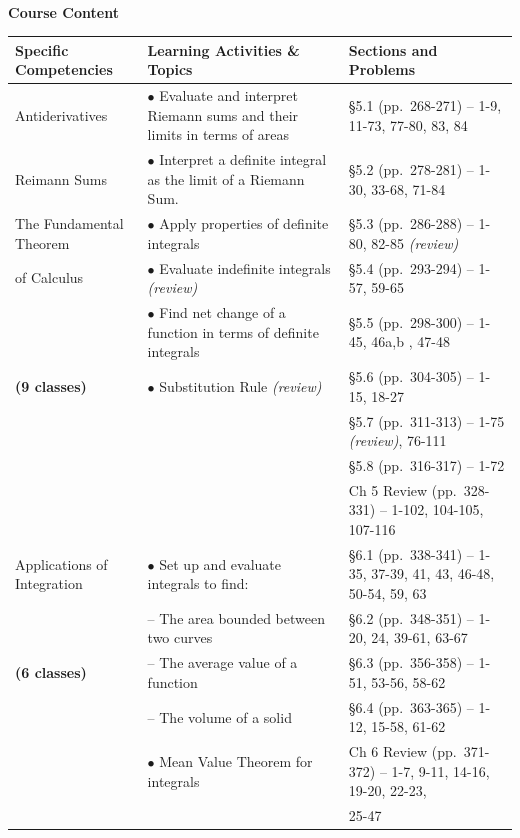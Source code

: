 \documentclass[10pt]{article}
\begin{document}
\vspace*{\fill}
\newpage
\begin{landscape}
$\,$\vspace{-0.75in}\\
\large{\textbf{Course Content}}\normalsize \\

\begin{longtable}[t]{||p{1.75in}|p{4.5in}|p{3.75in}||}
\hline
\textbf{Specific Competencies} & \textbf{Learning Activities \& Topics} & \textbf{Sections and Problems}\\
\hline

Antiderivatives			& $\bullet$ Evaluate and interpret Riemann sums and their limits in terms of areas	& \S 5.1 (pp.~268-271) -- 1-9, 11-73, 77-80, 83, 84\\
Reimann Sums				& $\bullet$ Interpret a definite integral as the limit of a Riemann Sum.		& \S 5.2 (pp.~278-281) -- 1-30, 33-68, 71-84 \\
The Fundamental Theorem & $\bullet$ Apply properties of definite integrals				& \S 5.3 (pp.~286-288) -- 1-80, 82-85 \textit{(review)}\\
\hspace{0.1in} of Calculus				& $\bullet$ Evaluate indefinite integrals \textit{(review)}						& \S 5.4 (pp.~293-294) -- 1-57, 59-65 \\
					& $\bullet$ Find net change of a function in terms of definite integrals	& \S 5.5 (pp.~298-300) -- 1-45, 46a,b , 47-48\\
\textbf{(9 classes)}					& $\bullet$ Substitution Rule \textit{(review)}				& \S 5.6 (pp.~304-305) -- 1-15, 18-27\\
					&									& \S 5.7 (pp.~311-313) -- 1-75 \textit{(review)}, 76-111 \\
					& 									& \S 5.8 (pp.~316-317) -- 1-72\\
					&									& Ch 5 Review (pp.~328-331) -- 1-102, 104-105, 107-116\\
\hline

Applications of Integration		& $\bullet$ Set up and evaluate integrals to find:	& \S 6.1 (pp.~338-341) -- 1-35, 37-39, 41, 43, 46-48, 50-54, 59, 63\\
					& \hspace{0.1in} -- The area bounded between two curves 		& \S 6.2 (pp.~348-351) -- 1-20, 24, 39-61, 63-67\\
\textbf{(6 classes)}					& \hspace{0.1in} -- The average value of a function	& \S 6.3 (pp.~356-358) -- 1-51, 53-56, 58-62\\
					& \hspace{0.1in} -- The volume of a solid								& \S 6.4 (pp.~363-365) -- 1-12, 15-58, 61-62\\
					& $\bullet$ Mean Value Theorem for integrals & Ch 6 Review (pp.~371-372) -- 1-7, 9-11, 14-16, 19-20, 22-23, \\
					&  & \phantom{Ch 6 Review (pp.~371-372) -- }25-47 \\
\hline


\end{longtable}
\end{landscape}
\end{document}
